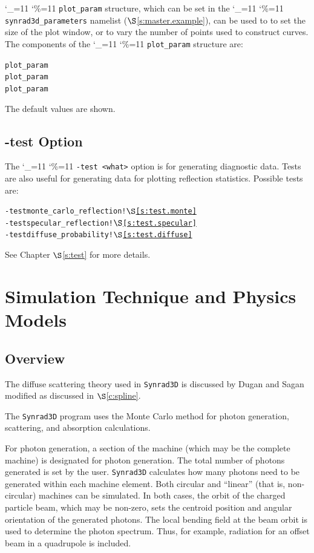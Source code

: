 \documentclass[11pt,openany]{report}
\newcommand{\sref}[1]{$\S$\ref{#1}}
\newcommand{\srthree}{\texttt{Synrad3D}\xspace}
\newcommand\ttcmd{\begingroup\catcode`\_=11 \catcode`\%=11 \dottcmd}
\newcommand\dottcmd[1]{\texttt{#1}\endgroup}
\newcommand{\vn}{\ttcmd}
\newlength{\ExBeg}
\newlength{\ExEnd}
\newenvironment{example}
  {\vspace{\ExBeg} \begin{alltt}}
  {\end{alltt} \vspace{\ExEnd}}
\begin{document}
\vn{plot_param} structure, which can be set in the \vn{synrad3d_parameters} namelist
(\sref{s:master.example}), can be used to to set the size of the plot window, or to vary the number
of points used to construct curves. The components of the \vn{plot_param} structure are:
\begin{example}
  plot_param%
  plot_param%
  plot_param%
\end{example}
The default values are shown.

\section{-test Option}

The \vn{-test <what>} option is for generating diagnostic data. Tests are also useful for generating
data for plotting reflection statistics. Possible tests are:
\begin{example}
  -test monte_carlo_reflection ! \sref{s:test.monte}
  -test specular_reflection    ! \sref{s:test.specular}
  -test diffuse_probability    ! \sref{s:test.diffuse}
\end{example}
See Chapter \sref{s:test} for more details.

\chapter{Simulation Technique and Physics Models}
\section{Overview} 

The diffuse scattering theory used in \srthree is discussed by 
Dugan and Sagan\cite{b:prab} modified as discussed in \sref{c:spline}.

The \srthree program uses the Monte Carlo method for photon
generation, scattering, and absorption calculations.

For photon generation, a section of the machine (which may be the
complete machine) is designated for photon generation.  The total
number of photons generated is set by the user. \srthree calculates
how many photons need to be generated within each machine
element. Both circular and ``linear'' (that is, non-circular) machines
can be simulated.  In both cases, the orbit of the charged particle
beam, which may be non-zero, sets the centroid position and angular
orientation of the generated photons. The local bending field at the
beam orbit is used to determine the photon spectrum. Thus, for
example, radiation for an offset beam in a quadrupole is included.
\end{document}
